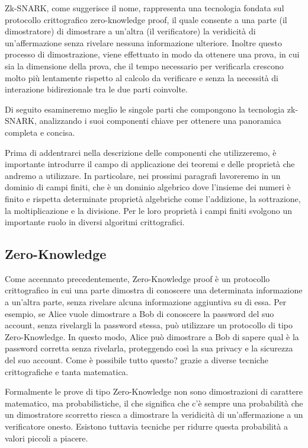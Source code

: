 Zk-SNARK, come suggerisce il nome, rappresenta una tecnologia fondata sul protocollo crittografico zero-knowledge proof,
il quale consente a una parte (il dimostratore) di dimostrare a un'altra (il verificatore) la veridicità di
un'affermazione senza rivelare nessuna informazione ulteriore. Inoltre questo processo di dimostrazione, viene
effettuato in modo da ottenere una prova, in cui sia la dimensione della prova, che il tempo necessario per verificarla
crescono molto più lentamente rispetto al calcolo da verificare e senza la necessità di interazione bidirezionale tra le
due parti coinvolte.

Di seguito esamineremo meglio le singole parti che compongono la tecnologia zk-SNARK, analizzando i suoi componenti
chiave per ottenere una panoramica completa e concisa.

Prima di addentrarci nella descrizione delle componenti che utilizzeremo, è importante introdurre il campo di
applicazione dei teoremi e delle proprietà che andremo a utilizzare. In particolare, nei prossimi paragrafi lavoreremo
in un dominio di campi finiti, che è un dominio algebrico dove l'insieme dei numeri è finito e rispetta determinate
proprietà algebriche come l'addizione, la sottrazione, la moltiplicazione e la divisione. Per le loro proprietà i campi
finiti svolgono un importante ruolo in diversi algoritmi crittografici.

\subsection{Zero-Knowledge}
\label{sec:Zero-Knowledge}

Come accennato precedentemente, Zero-Knowledge proof è un protocollo crittografico in cui una parte dimostra di
conoscere una determinata informazione a un'altra parte, senza rivelare alcuna informazione aggiuntiva su di essa. Per
esempio, se Alice vuole dimostrare a Bob di conoscere la password del suo account, senza rivelargli la password stessa,
può utilizzare un protocollo di tipo Zero-Knowledge. In questo modo, Alice può dimostrare a Bob di sapere qual è la
password corretta senza rivelarla, proteggendo così la sua privacy e la sicurezza del suo account. Come è possibile
tutto questo? grazie a diverse tecniche crittografiche e tanta matematica.

Formalmente le prove di tipo Zero-Knowledge non sono dimostrazioni di carattere matematico, ma probabilistiche, il che
significa che c'è sempre una probabilità che un dimostratore scorretto riesca a dimostrare la veridicità di
un'affermazione a un verificatore onesto. Esistono tuttavia tecniche per ridurre questa probabilità a valori piccoli a
piacere.

